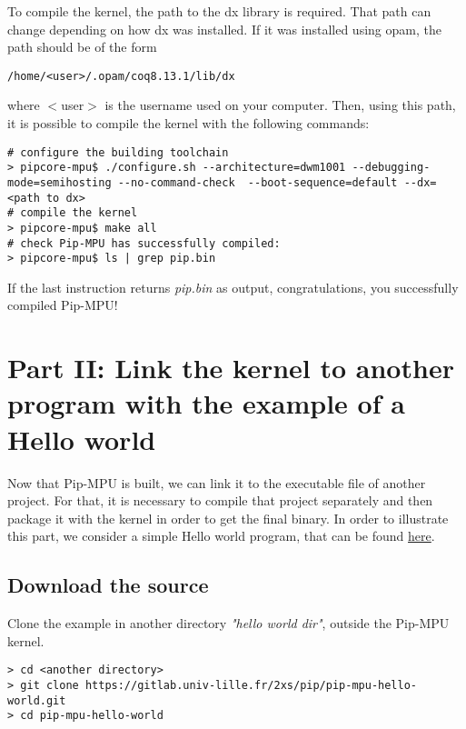 \documentclass[10pt,a4paper,titlepage]{refart}
\begin{document}
To compile the kernel, the path to the dx library is required. That path can change depending on how dx was installed. 
If it was installed using opam, the path should be of the form

\begin{lstlisting}[style=BashStyle]
/home/<user>/.opam/coq8.13.1/lib/dx
\end{lstlisting}

where $<$user$>$ is the username used on your computer. Then, using this path, it is possible to compile the kernel with 
the following commands:

\begin{lstlisting}[style=BashStyle]
# configure the building toolchain
> pipcore-mpu$ ./configure.sh --architecture=dwm1001 --debugging-mode=semihosting --no-command-check  --boot-sequence=default --dx=<path to dx>
# compile the kernel
> pipcore-mpu$ make all
# check Pip-MPU has successfully compiled:
> pipcore-mpu$ ls | grep pip.bin
\end{lstlisting}

If the last instruction returns \textit{pip.bin} as output, congratulations, you successfully compiled Pip-MPU!

\section{Part II: Link the kernel to another program with the example of a Hello world} \label{second}

Now that Pip-MPU is built, we can link it to the executable file of another project. For that, it is necessary to compile that project 
separately and then package it with the kernel in order to get the final binary. In order to illustrate this part, we consider a simple 
Hello world program, that can be found \href{(https://gitlab.univ-lille.fr/2xs/pip/pip-mpu-hello-world)}{here}.

\subsection{Download the source}
Clone the example in another directory \textit{"hello world dir"}, outside the Pip-MPU kernel.

\begin{lstlisting}[style=BashStyle]
> cd <another directory>
> git clone https://gitlab.univ-lille.fr/2xs/pip/pip-mpu-hello-world.git
> cd pip-mpu-hello-world
\end{lstlisting}
\end{document}
